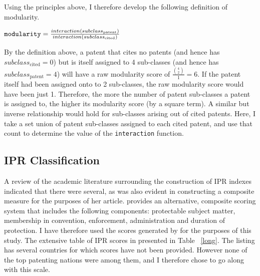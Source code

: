\documentclass[12pt]{article}
\begin{document}
Using the principles above, I therefore develop the following definition of modularity.
\begin{center}$ \verb|modularity| = \frac{interaction(subclass_{\text{patent}})}{interaction(subclass_{\text{cited}})} $ \end{center}

By the definition above, a patent that cites no patents (and hence has $subclass_{\text{cited}} = 0$) but is itself assigned to 4 sub-classes (and hence has $subclass_{\text{patent}} = 4$) will have a raw modularity score of $\frac{\binom{4}{2}}{1} = 6$. If the patent itself had been assigned onto to 2 sub-classes, the raw modularity score would have been just 1. Therefore, the more the number of patent sub-classes a patent is assigned to, the higher its modularity score (by a square term). A similar but inverse relationship would hold for sub-classes arising out of cited patents. Here, I take a set union of patent sub-classes assigned to each cited patent, and use that count to determine the value of the \verb|interaction| function.

\subsection{IPR Classification}
A review of the academic literature surrounding the construction of IPR indexes indicated that there were several, as was also evident in \cite{Zhao2006} constructing a composite measure for the purposes of her article. \cite{Lesser2010} provides an alternative, composite scoring system that includes the following components: protectable subject matter, membership in convention, enforcement, administration and duration of protection. I have therefore used the scores generated by \cite{Lesser2010} for the purposes of this study. The extensive table of IPR scores in presented in Table ~\ref{long}. The listing has several countries for which scores have not been provided. However none of the top patenting nations were among them, and I therefore chose to go along with this scale.
\end{document}
